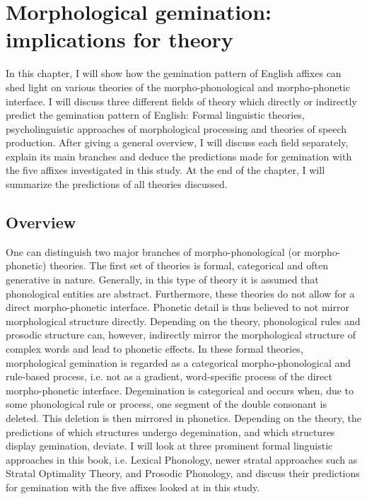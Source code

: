 \chapter {Morphological gemination: implications for theory} \label{Theory}

In this chapter, I will show how the gemination pattern of English affixes can shed light on various theories of the morpho-phonological and morpho-phonetic interface. I will discuss three different fields of theory which directly or indirectly predict the gemination pattern of English: Formal linguistic theories, psycholinguistic approaches of morphological processing and theories of speech production. After giving a general overview, I will discuss each field  separately, explain its main branches and deduce the predictions made for gemination with the five affixes investigated in this study.  At the end of the chapter, I will summarize the predictions of all theories discussed.\\


\section{Overview}
One can distinguish two major branches of morpho-phonological (or morpho-phonetic) theories. The first set of theories is formal, categorical and often generative in nature. Generally, in this type of theory it is assumed that phonological entities are abstract. Furthermore, these theories do not allow for a direct morpho-phonetic interface. Phonetic detail is thus believed to not mirror morphological structure directly. Depending on the theory, phonological rules and prosodic structure can, however, indirectly mirror the morphological structure of complex words and lead to phonetic effects. 
In these formal theories, morphological gemination is regarded as a categorical morpho-phonological and rule-based process, i.e. not as a gradient, word-specific process of the direct morpho-phonetic interface. Degemination is categorical and occurs when, due to some phonological rule or process, one segment of the double consonant is deleted. This deletion is then mirrored in phonetics. Depending on the theory, the predictions of which structures undergo degemination, and which structures display gemination, deviate. I will look at three prominent formal linguistic approaches in this book, i.e. Lexical Phonology, newer stratal approaches such as Stratal Optimality Theory, and Prosodic Phonology,  and discuss their predictions for gemination with the five affixes looked at in this study. 

